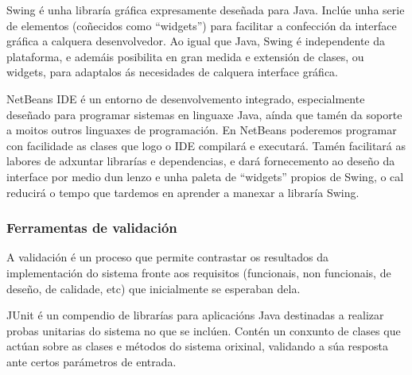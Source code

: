 
Swing é unha libraría gráfica expresamente deseñada para Java. Inclúe unha serie de elementos (coñecidos como ``widgets'') para facilitar a confección da interface gráfica a calquera desenvolvedor. Ao igual que Java, Swing é independente da plataforma, e ademáis posibilita en gran medida e extensión de clases, ou widgets, para adaptalos ás necesidades de calquera interface gráfica.


NetBeans IDE é un entorno de desenvolvemento integrado, especialmente deseñado para programar sistemas en linguaxe Java, aínda que tamén da soporte a moitos outros linguaxes de programación. En NetBeans poderemos programar con facilidade as clases que logo o IDE compilará e executará. Tamén facilitará as labores de adxuntar librarías e dependencias, e dará fornecemento ao deseño da interface por medio dun lenzo e unha paleta de ``widgets'' propios de Swing, o cal reducirá o tempo que tardemos en aprender a manexar a libraría Swing.

\subsubsection{Ferramentas de validación}

A validación é un proceso que permite contrastar os resultados da implementación do sistema fronte aos requisitos (funcionais, non funcionais, de deseño, de calidade, etc) que inicialmente se esperaban dela.


JUnit \cite{junit} é un compendio de librarías para aplicacións Java destinadas a realizar probas unitarias do sistema no que se inclúen. Contén un conxunto de clases que actúan sobre as clases e métodos do sistema orixinal, validando a súa resposta ante certos parámetros de entrada.